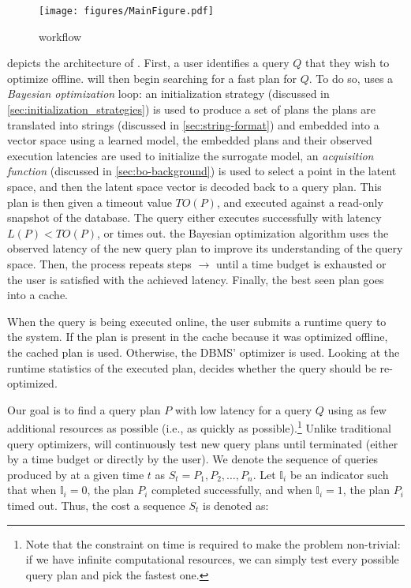 \begin{figure}
    \centering
    \texttt{[image: figures/MainFigure.pdf]}
    \caption{\sysname workflow}
    \label{fig:system_model}
\end{figure}

  depicts the architecture of \sysname. First,
\circleOne a user identifies a query $Q$ that they wish to optimize offline. \sysname will then begin searching for a fast plan for $Q$. To do so, \sysname uses a \emph{Bayesian optimization} loop:
\circleTwo an initialization strategy (discussed in \cref{sec:initialization_strategies}) is used to produce a set of plans
\circleThree the plans are translated into strings (discussed in \cref{sec:string-format}) and embedded into a vector space using a learned model, 
\circleFour the embedded plans and their observed execution latencies are used to initialize the surrogate model, 
\circleFive an \emph{acquisition function} (discussed in \cref{sec:bo-background}) is used to select a point in the latent space, and then
\circleSix the latent space vector is decoded back to a query plan.
\circleSeven This plan is then given a timeout value $TO(P)$, and executed against a read-only snapshot of the database. The query either executes successfully with latency $L(P) < TO(P)$, or times out.
\circleEight the Bayesian optimization algorithm uses the observed latency of the new query plan to improve its understanding of the query space. Then, the process repeats steps \circleFive $\to$ \circleEight until a time budget is exhausted or the user is satisfied with the achieved latency.
\circleNine Finally, the best seen plan goes into a cache.

When the query is being executed online, \textcolor{red}{\circleOne} the user submits a runtime query to the system. \textcolor{red}{\circleTwo} If the plan is present in the cache because it was optimized offline, the cached plan is used. Otherwise, the DBMS' optimizer is used. \textcolor{red}{\circleThree} Looking at the runtime statistics of the executed plan, \sysname decides whether the query should be re-optimized.

 Our goal is to find a query plan $P$ with low latency for a query $Q$ using as few additional resources as possible (i.e., as quickly as possible).\footnote{Note that the constraint on time is required to make the problem non-trivial: if we have infinite computational resources, we can simply test every possible query plan and pick the fastest one.} Unlike traditional query optimizers, \sysname will continuously test new query plans until terminated (either by a time budget or directly by the user). We denote the sequence of queries produced by \sysname at a given time $t$ as $S_t = P_1, P_2, \dots, P_n$. Let $\mathbb{I}_i$ be an indicator such that when $\mathbb{I}_i = 0$, the plan $P_i$ completed successfully, and when $\mathbb{I}_i = 1$, the plan $P_i$ timed out. Thus, the cost a sequence $S_t$ is denoted as:

